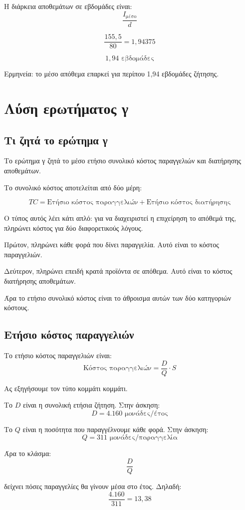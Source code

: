 \documentclass[12pt,a4paper]{article}
\begin{document}
Η διάρκεια αποθεμάτων σε εβδομάδες είναι:
\[
\frac{I_{\text{μέσο}}}{d}
\]

\[
\frac{155{,}5}{80}=1{,}94375
\]

\[
\boxed{1{,}94 \text{ εβδομάδες}}
\]

Ερμηνεία: το μέσο απόθεμα επαρκεί για περίπου 1,94 εβδομάδες ζήτησης.

\section{Λύση ερωτήματος γ}

\subsection{Τι ζητά το ερώτημα γ}

Το ερώτημα γ ζητά το μέσο ετήσιο συνολικό κόστος παραγγελιών και διατήρησης αποθεμάτων.

Το συνολικό κόστος αποτελείται από δύο μέρη:

\[
TC=\text{Ετήσιο κόστος παραγγελιών}+\text{Ετήσιο κόστος διατήρησης}
\]

Ο τύπος αυτός λέει κάτι απλό: για να διαχειριστεί η επιχείρηση το απόθεμά της, πληρώνει κόστος για δύο διαφορετικούς λόγους.

Πρώτον, πληρώνει κάθε φορά που δίνει παραγγελία. Αυτό είναι το κόστος παραγγελιών.

Δεύτερον, πληρώνει επειδή κρατά προϊόντα σε απόθεμα. Αυτό είναι το κόστος διατήρησης αποθεμάτων.

Άρα το ετήσιο συνολικό κόστος είναι το άθροισμα αυτών των δύο κατηγοριών κόστους.

\subsection{Ετήσιο κόστος παραγγελιών}

Το ετήσιο κόστος παραγγελιών είναι:
\[
\text{Κόστος παραγγελιών}=\frac{D}{Q}\cdot S
\]

Ας εξηγήσουμε τον τύπο κομμάτι κομμάτι.

Το \(D\) είναι η συνολική ετήσια ζήτηση. Στην άσκηση:
\[
D=4.160 \text{ μονάδες/έτος}
\]

Το \(Q\) είναι η ποσότητα που παραγγέλνουμε κάθε φορά. Στην άσκηση:
\[
Q=311 \text{ μονάδες/παραγγελία}
\]

Άρα το κλάσμα:
\[
\frac{D}{Q}
\]

δείχνει πόσες παραγγελίες θα γίνουν μέσα στο έτος. Δηλαδή:
\[
\frac{4.160}{311}=13{,}38
\]
\end{document}
